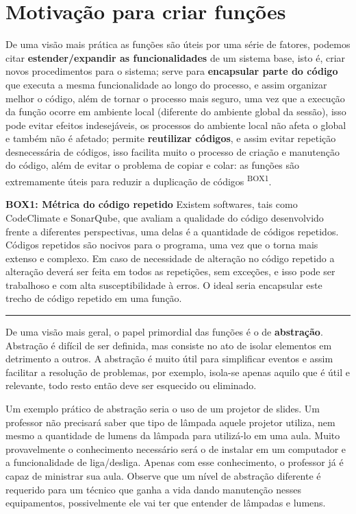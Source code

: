 \documentclass[
  11pt,
  a5paper,
  openany]{book}
\begin{document}
\hypertarget{motivauxe7uxe3o-para-criar-funuxe7uxf5es}{%
\section{Motivação para criar funções}\label{motivauxe7uxe3o-para-criar-funuxe7uxf5es}}

De uma visão mais prática as funções são úteis por uma série de fatores, podemos citar \textbf{estender/expandir as funcionalidades} de um sistema base, isto é, criar novos procedimentos para o sistema; serve para \textbf{encapsular parte do código} que executa a mesma funcionalidade ao longo do processo, e assim organizar melhor o código, além de tornar o processo mais seguro, uma vez que a execução da função ocorre em ambiente local (diferente do ambiente global da sessão), isso pode evitar efeitos indesejáveis, os processos do ambiente local não afeta o global e também não é afetado; permite \textbf{reutilizar códigos}, e assim evitar repetição desnecessária de códigos, isso facilita muito o processo de criação e manutenção do código, além de evitar o problema de copiar e colar: as funções são extremamente úteis para reduzir a duplicação de códigos \textsuperscript{BOX1}.

\textbf{BOX1: Métrica do código repetido}
Existem softwares, tais como CodeClimate e SonarQube, que avaliam a qualidade do código desenvolvido frente a diferentes perspectivas, uma delas é a quantidade de códigos repetidos. Códigos repetidos são nocivos para o programa, uma vez que o torna mais extenso e complexo. Em caso de necessidade de alteração no código repetido a alteração deverá ser feita em todos as repetições, sem exceções, e isso pode ser trabalhoso e com alta susceptibilidade à erros. O ideal seria encapsular este trecho de código repetido em uma função.

\begin{center}\rule{0.5\linewidth}{0.5pt}\end{center}

De uma visão mais geral, o papel primordial das funções é o de \textbf{abstração}. Abstração é difícil de ser definida, mas consiste no ato de isolar elementos em detrimento a outros. A abstração é muito útil para simplificar eventos e assim facilitar a resolução de problemas, por exemplo, isola-se apenas aquilo que é útil e relevante, todo resto então deve ser esquecido ou eliminado.

Um exemplo prático de abstração seria o uso de um projetor de slides. Um professor não precisará saber que tipo de lâmpada aquele projetor utiliza, nem mesmo a quantidade de lumens da lâmpada para utilizá-lo em uma aula. Muito provavelmente o conhecimento necessário será o de instalar em um computador e a funcionalidade de liga/desliga. Apenas com esse conhecimento, o professor já é capaz de ministrar sua aula. Observe que um nível de abstração diferente é requerido para um técnico que ganha a vida dando manutenção nesses equipamentos, possivelmente ele vai ter que entender de lâmpadas e lumens.
\end{document}
